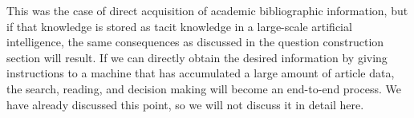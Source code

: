 This was the case of direct acquisition of academic bibliographic information, but if that knowledge is stored as tacit knowledge in a large-scale artificial intelligence, the same consequences as discussed in the question construction section will result. If we can directly obtain the desired information by giving instructions to a machine that has accumulated a large amount of article data, the search, reading, and decision making will become an end-to-end process. We have already discussed this point, so we will not discuss it in detail here.





